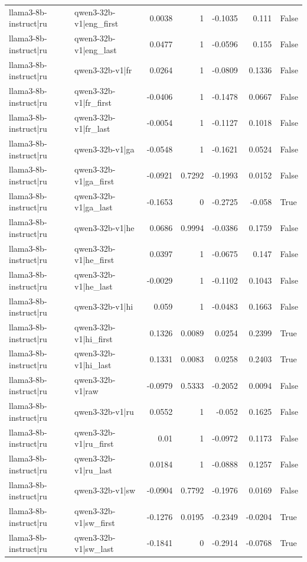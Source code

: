 \begin{table}
\begin{tabular}{l l r r r r l}
llama3-8b-instruct|ru & qwen3-32b-v1|eng_first & 0.0038 & 1 & -0.1035 & 0.111 & False \\
llama3-8b-instruct|ru & qwen3-32b-v1|eng_last & 0.0477 & 1 & -0.0596 & 0.155 & False \\
llama3-8b-instruct|ru & qwen3-32b-v1|fr & 0.0264 & 1 & -0.0809 & 0.1336 & False \\
llama3-8b-instruct|ru & qwen3-32b-v1|fr_first & -0.0406 & 1 & -0.1478 & 0.0667 & False \\
llama3-8b-instruct|ru & qwen3-32b-v1|fr_last & -0.0054 & 1 & -0.1127 & 0.1018 & False \\
llama3-8b-instruct|ru & qwen3-32b-v1|ga & -0.0548 & 1 & -0.1621 & 0.0524 & False \\
llama3-8b-instruct|ru & qwen3-32b-v1|ga_first & -0.0921 & 0.7292 & -0.1993 & 0.0152 & False \\
llama3-8b-instruct|ru & qwen3-32b-v1|ga_last & -0.1653 & 0 & -0.2725 & -0.058 & True \\
llama3-8b-instruct|ru & qwen3-32b-v1|he & 0.0686 & 0.9994 & -0.0386 & 0.1759 & False \\
llama3-8b-instruct|ru & qwen3-32b-v1|he_first & 0.0397 & 1 & -0.0675 & 0.147 & False \\
llama3-8b-instruct|ru & qwen3-32b-v1|he_last & -0.0029 & 1 & -0.1102 & 0.1043 & False \\
llama3-8b-instruct|ru & qwen3-32b-v1|hi & 0.059 & 1 & -0.0483 & 0.1663 & False \\
llama3-8b-instruct|ru & qwen3-32b-v1|hi_first & 0.1326 & 0.0089 & 0.0254 & 0.2399 & True \\
llama3-8b-instruct|ru & qwen3-32b-v1|hi_last & 0.1331 & 0.0083 & 0.0258 & 0.2403 & True \\
llama3-8b-instruct|ru & qwen3-32b-v1|raw & -0.0979 & 0.5333 & -0.2052 & 0.0094 & False \\
llama3-8b-instruct|ru & qwen3-32b-v1|ru & 0.0552 & 1 & -0.052 & 0.1625 & False \\
llama3-8b-instruct|ru & qwen3-32b-v1|ru_first & 0.01 & 1 & -0.0972 & 0.1173 & False \\
llama3-8b-instruct|ru & qwen3-32b-v1|ru_last & 0.0184 & 1 & -0.0888 & 0.1257 & False \\
llama3-8b-instruct|ru & qwen3-32b-v1|sw & -0.0904 & 0.7792 & -0.1976 & 0.0169 & False \\
llama3-8b-instruct|ru & qwen3-32b-v1|sw_first & -0.1276 & 0.0195 & -0.2349 & -0.0204 & True \\
llama3-8b-instruct|ru & qwen3-32b-v1|sw_last & -0.1841 & 0 & -0.2914 & -0.0768 & True \\

\end{tabular}
\end{table}
